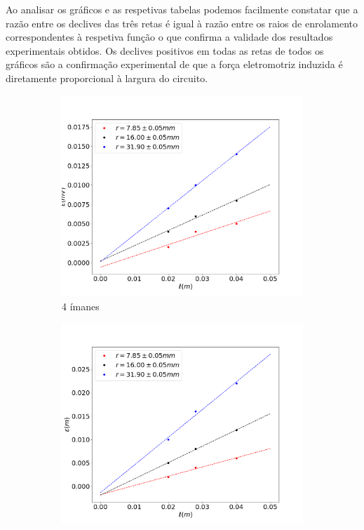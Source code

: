 \documentclass[11pt]{report}
\begin{document}
Ao analisar os gráficos e as respetivas tabelas podemos facilmente constatar que a razão entre os declives das três retas é igual à razão entre os raios de enrolamento correspondentes à respetiva função o que confirma a validade dos resultados experimentais obtidos. Os declives positivos em todas as retas de todos os gráficos são a confirmação experimental de que a força eletromotriz induzida é diretamente proporcional à largura do circuito.

\begin{figure}[H]
\centering
\begin{subfigure}{.5\textwidth}
  \centering
  \includegraphics[width=1\linewidth]{i4lfem.png}
  \caption{4 ímanes}
  \label{fig:sub1}
\end{subfigure}%
\begin{subfigure}{.5\textwidth}
  \centering
  \includegraphics[width=1\linewidth]{i6lfem.png}

\end{subfigure}
\end{figure}
\end{document}
